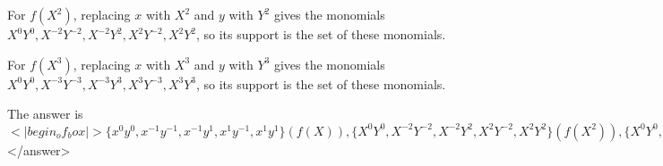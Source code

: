 For \( f(X^2) \), replacing \( x \) with \( X^2 \) and \( y \) with \( Y^2 \) gives the monomials \( X^0Y^0, X^{-2}Y^{-2}, X^{-2}Y^2, X^2Y^{-2}, X^2Y^2 \), so its support is the set of these monomials.  

For \( f(X^3) \), replacing \( x \) with \( X^3 \) and \( y \) with \( Y^3 \) gives the monomials \( X^0Y^0, X^{-3}Y^{-3}, X^{-3}Y^3, X^3Y^{-3}, X^3Y^3 \), so its support is the set of these monomials.  

The answer is \(<|begin_of_box|>\{x^0y^0, x^{-1}y^{-1}, x^{-1}y^1, x^1y^{-1}, x^1y^1\} (f(X)), \{X^0Y^0, X^{-2}Y^{-2}, X^{-2}Y^2, X^2Y^{-2}, X^2Y^2\} (f(X^2)), \{X^0Y^0, X^{-3}Y^{-3}, X^{-3}Y^3, X^3Y^{-3}, X^3Y^3\} (f(X^3))<|end_of_box|>\)</answer>
